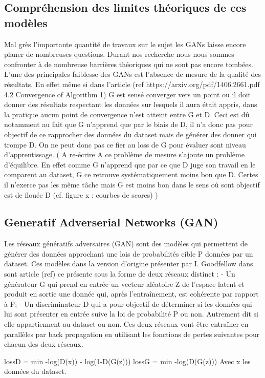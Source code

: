 \documentclass[11pt]{article}
\begin{document}
\subsection{Compréhension des limites théoriques de ces modèles}
Mal grès l'importante quantité de travaux sur le sujet les GANs laisse encore planer de nombreuses questions.
Durant nos recherche nous nous sommes confronter à de nombreuse barrières théoriques qui ne sont pas encore tombées. 
L'une des principales faiblesse des GANs est l'absence de mesure de la qualité des résultats. En effet même si dans l'article (ref https://arxiv.org/pdf/1406.2661.pdf 4.2  Convergence of Algorithm 1) G est sensé converger vers un point ou il doit donner des résultats respectant les données sur lesquels il aura était appris, dans la pratique aucun point de convergence n'est atteint entre G et D. Ceci est dû notamment au fait que G n'apprend que par le biais de D, il n'a donc pas pour objectif de ce rapprocher des données du dataset mais de générer des donner qui trompe D. On ne peut donc pas ce fier au loss de G pour évaluer sont niveau d'apprentissage.
( A re-écrire 
A ce problème de mesure s'ajoute un problème d'équilibre.
En effet comme G n'apprend que par ce que D juge son travail en le comparent au dataset, G ce retrouve systématiquement moins bon que D. Certes il n'exerce pas les même tâche mais G est moins bon dans le sens où sont objectif est de flouée D (cf. figure x : courbes de scores) 
)

\subsection{Generatif Adverserial Networks (GAN)}
Les réseaux génératifs adversaires (GAN) sont des modèles qui permettent de générer des données approchant une lois de probabilités cible P données par un dataset.
Ces modèles dans la version d'origine présenter par I. Goodfellow dans sont article (ref) ce présente sous la forme de deux réseaux distinct :
  - Un générateur G qui prend en entrée un vecteur aléatoire Z de l'espace latent et produit en sortie une donnée qui, après l'entraînement, est cohérente par rapport à P;
  - Un discriminateur D qui a pour objectif de déterminer si les données qui lui sont présenter en entrée suive la loi de probabilité P ou non. Autrement dit si elle appartiennent au dataset ou non.
Ces deux réseaux vont être entraîner en parallèles par back propagation en utilisant les fonctions de pertes suivantes pour chacun des deux réseaux.

lossD = min -log(D(x)) - log(1-D(G(z)))
lossG = min -log(D(G(z)))
Avec x les données du dataset.
\end{document}
